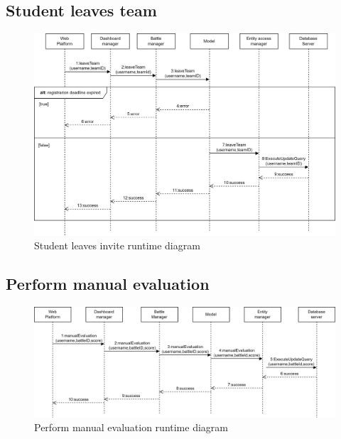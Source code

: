 \subsection*{Student leaves team}
\begin{figure}[h]
    \centering
    \includegraphics[width=\textwidth]{images/runtime/leaveTeam.png}
    \caption{Student leaves invite runtime diagram}
    \label{fig:rt-leaveTeam}
\end{figure}
\clearpage

\subsection*{Perform manual evaluation}
\begin{figure}[h]
    \centering
    \includegraphics[width=\textwidth]{images/runtime/evalM.png}
    \caption{Perform manual evaluation runtime diagram}
    \label{fig:rt-evalM}
\end{figure}


